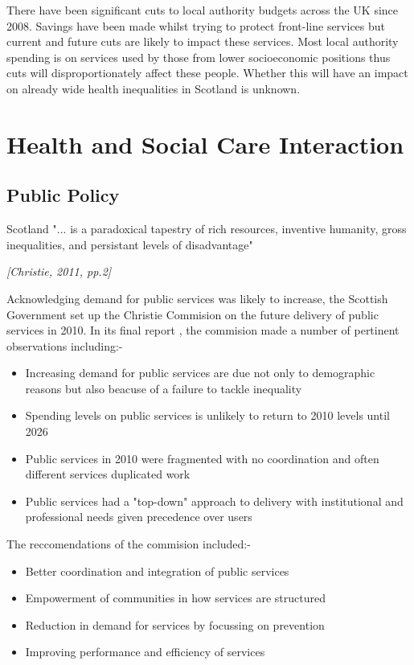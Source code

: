 \documentclass[12pt,]{report}
\begin{document}
There have been significant cuts to local authority budgets across the
UK since 2008. Savings have been made whilst trying to protect
front-line services but current and future cuts are likely to impact
these services. Most local authority spending is on services used by
those from lower socioeconomic positions thus cuts will
disproportionately affect these people. Whether this will have an impact
on already wide health inequalities in Scotland is unknown.

\section{Health and Social Care Interaction}\label{sec:hsc-interaction}

\subsection{Public Policy}\label{subsec:policy}

\epigraph{Scotland "... is a paradoxical tapestry of rich resources, inventive humanity, gross inequalities, and persistant levels of disadvantage"}{\textit{[Christie, 2011, pp.2]}}

Acknowledging demand for public services was likely to increase, the
Scottish Government set up the Christie Commision on the future delivery
of public services in 2010. In its final report \citep{RN451}, the
commision made a number of pertinent observations including:-

\begin{itemize}[noitemsep]
\item Increasing demand for public services are due not only to demographic reasons but also beacuse of a failure to tackle inequality
\item Spending levels on public services is unlikely to return to 2010 levels until 2026
\item Public services in 2010 were fragmented with no coordination and often different services duplicated work
\item Public services had a "top-down" approach to delivery with institutional and professional needs given precedence over users
\end{itemize}

The reccomendations of the commision included:-

\begin{itemize}[noitemsep]
\item Better coordination and integration of public services
\item Empowerment of communities in how services are structured
\item Reduction in demand for services by focussing on prevention
\item Improving performance and efficiency of services
\end{itemize}
\end{document}
